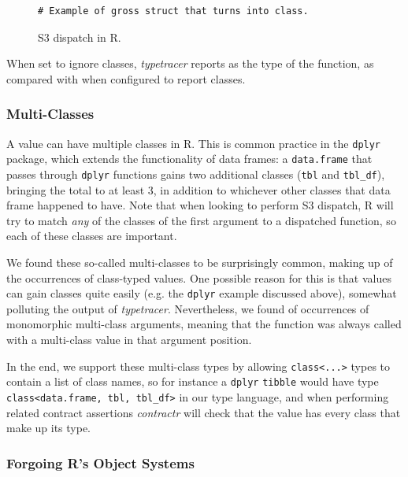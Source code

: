\documentclass[acmsmall,review,anonymous]{acmart}\settopmatter{printfolios=true,printccs=false,printacmref=false}
\newcommand{\code}[1]{{\lstinline[style=Rin]!#1!}\xspace}
\newcommand{\contractr}{\emph{contractr}\xspace} %
\newcommand{\typetracer}{\emph{typetracer}\xspace} %
\begin{document}
\begin{figure}[htbp]
\begin{center}

\begin{lstlisting}
# Example of gross struct that turns into class.
\end{lstlisting}

\caption{S3 dispatch in R.}
\label{fig:class-vs-struct}
\end{center}
\end{figure}

When set to ignore classes, \typetracer reports  as the type of the function, as compared with  when configured to report classes.

%
%
\subsubsection{Multi-Classes}

A value can have multiple classes in R.  This is common practice in the
\code{dplyr} package, which extends the functionality of data frames: a
\code{data.frame} that passes through \code{dplyr} functions gains two
additional classes (\code{tbl} and \code{tbl_df}), bringing the total to at
least 3, in addition to whichever other classes that data frame happened to
have.  Note that when looking to perform S3 dispatch, R will try to match
{\it any} of the classes of the first argument to a dispatched function, so
each of these classes are important.

We found these so-called multi-classes to be surprisingly common, making up
 of the occurrences of class-typed values.  One possible
reason for this is that values can gain classes quite easily (e.g. the
\code{dplyr} example discussed above), somewhat polluting the output of
\typetracer.  Nevertheless, we found  of occurrences of
monomorphic multi-class arguments, meaning that the function was always
called with a multi-class value in that argument position.

In the end, we support these multi-class types by allowing \code{class<...>}
types to contain a list of class names, so for instance a \code{dplyr}
\code{tibble} would have type \code{class<data.frame, tbl, tbl_df>} in our
type language, and when performing related contract assertions \contractr
will check that the value has every class that make up its type.

%
%
\subsubsection{Forgoing R's Object Systems}
\end{document}
